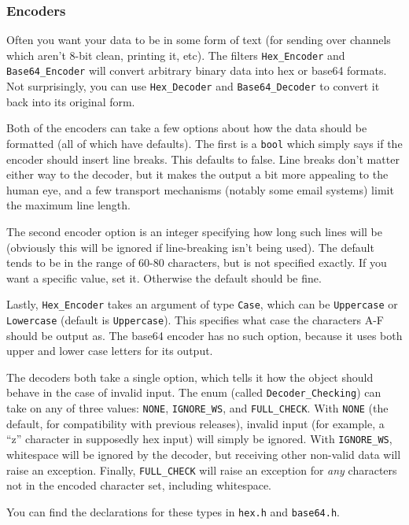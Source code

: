 \documentclass{article}
\newcommand{\filename}[1]{\texttt{#1}}
\newcommand{\type}[1]{\texttt{#1}}
\begin{document}
\subsubsection{Encoders}

Often you want your data to be in some form of text (for sending over channels
which aren't 8-bit clean, printing it, etc). The filters \type{Hex\_Encoder}
and \type{Base64\_Encoder} will convert arbitrary binary data into hex or
base64 formats. Not surprisingly, you can use \type{Hex\_Decoder} and
\type{Base64\_Decoder} to convert it back into its original form.

Both of the encoders can take a few options about how the data should be
formatted (all of which have defaults). The first is a \type{bool} which simply
says if the encoder should insert line breaks. This defaults to
false. Line breaks don't matter either way to the decoder, but it makes the
output a bit more appealing to the human eye, and a few transport mechanisms
(notably some email systems) limit the maximum line length.

The second encoder option is an integer specifying how long such lines will be
(obviously this will be ignored if line-breaking isn't being used). The default
tends to be in the range of 60-80 characters, but is not specified exactly. If
you want a specific value, set it. Otherwise the default should be fine.

Lastly, \type{Hex\_Encoder} takes an argument of type \type{Case}, which can be
\type{Uppercase} or \type{Lowercase} (default is \type{Uppercase}). This
specifies what case the characters A-F should be output as. The base64 encoder
has no such option, because it uses both upper and lower case letters for its
output.

The decoders both take a single option, which tells it how the object should
behave in the case of invalid input. The enum (called \type{Decoder\_Checking})
can take on any of three values: \type{NONE}, \type{IGNORE\_WS}, and
\type{FULL\_CHECK}. With \type{NONE} (the default, for compatibility with
previous releases), invalid input (for example, a ``z'' character in supposedly
hex input) will simply be ignored. With \type{IGNORE\_WS}, whitespace will be
ignored by the decoder, but receiving other non-valid data will raise an
exception. Finally, \type{FULL\_CHECK} will raise an exception for \emph{any}
characters not in the encoded character set, including whitespace.

You can find the declarations for these types in \filename{hex.h} and
\filename{base64.h}.
\end{document}
